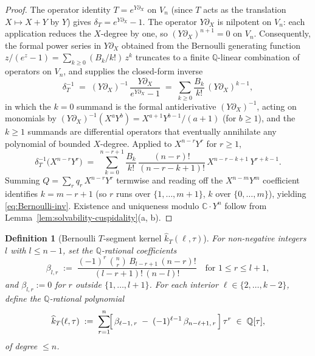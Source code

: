 \documentclass[11pt]{article}
\newtheorem{definition}[theorem]{Definition}
\numberwithin{equation}{section}  %
\newcommand{\QQ}{\mathbb{Q}}
\newcommand{\CC}{\mathbb{C}}
\begin{document}
\begin{proof}
The operator identity $T = e^{Y \partial_X}$ on $V_n$ (since $T$ acts as
the translation $X \mapsto X + Y$ by $Y$) gives
$\delta_T = e^{Y \partial_X} - 1$.  The operator $Y \partial_X$ is
nilpotent on $V_n$: each application reduces the $X$-degree by one, so
$(Y \partial_X)^{n + 1} = 0$ on $V_n$.  Consequently, the formal power
series in $Y \partial_X$ obtained from the Bernoulli generating function
$z/(e^z - 1) = \sum_{k \ge 0}(B_k/k!)\,z^k$ truncates to a finite
$\QQ$-linear combination of operators on $V_n$, and supplies the
closed-form inverse
\begin{equation}\label{eq:delta-T-inverse-operator}
  \delta_T^{-1}
  \;=\; (Y \partial_X)^{-1}\,\frac{Y \partial_X}{e^{Y \partial_X} - 1}
  \;=\; \sum_{k \ge 0}\!\frac{B_k}{k!}\,(Y \partial_X)^{k - 1},
\end{equation}
in which the $k = 0$ summand is the formal antiderivative
$(Y \partial_X)^{-1}$, acting on monomials by
$(Y \partial_X)^{-1}(X^a Y^b) = X^{a + 1} Y^{b - 1}/(a + 1)$ (for $b \ge 1$),
and the $k \ge 1$ summands are differential operators that eventually
annihilate any polynomial of bounded $X$-degree.  Applied to
$X^{n - r} Y^r$ for $r \ge 1$,
\begin{equation}\label{eq:delta-T-inverse-monomial}
  \delta_T^{-1}\bigl(X^{n - r} Y^r\bigr)
  \;=\; \sum_{k = 0}^{n - r + 1}\!\frac{B_k}{k!}\,
        \frac{(n - r)!}{(n - r - k + 1)!}\,X^{n - r - k + 1}\,Y^{r + k - 1}.
\end{equation}
Summing $Q = \sum_r q_r\,X^{n - r} Y^r$ termwise and reading off the
$X^{n - m} Y^m$ coefficient identifies $k = m - r + 1$ (so $r$ runs over
$\{1, \ldots, m + 1\}$, $k$ over $\{0, \ldots, m\}$), yielding
\eqref{eq:Bernoulli-inv}.  Existence and uniqueness modulo
$\CC \cdot Y^n$ follow from Lemma~\ref{lem:solvability-cuspidality}(a, b).
\end{proof}

\begin{definition}[Bernoulli $T$-segment kernel $\widehat{k}_T(\ell, \tau)$]\label{def:khat-T}
For non-negative integers $l$ with $l \le n - 1$, set the
$\QQ$-rational coefficients
\begin{equation}\label{eq:beta-def}
  \beta_{l, r}
  \;:=\; \frac{(-1)^r\,\binom{n}{r}\,B_{l - r + 1}\,(n - r)!}{(l - r + 1)!\,(n - l)!}
  \quad \text{for } 1 \le r \le l + 1,
\end{equation}
and $\beta_{l, r} := 0$ for $r$ outside $\{1, \ldots, l + 1\}$.  For each
interior $\ell \in \{2, \ldots, k - 2\}$, define the $\QQ$-rational
polynomial
\begin{equation}\label{eq:khat-T-def}
  \widehat{k}_T(\ell, \tau)
  \;:=\; \sum_{r = 1}^{n}\!\Bigl[\,\beta_{\ell - 1,\,r} \;-\; (-1)^{\ell - 1}\,\beta_{n - \ell + 1,\,r}\,\Bigr]\,\tau^r
  \;\in\; \QQ[\tau],
\end{equation}
of degree $\le n$.
\end{definition}
\end{document}
